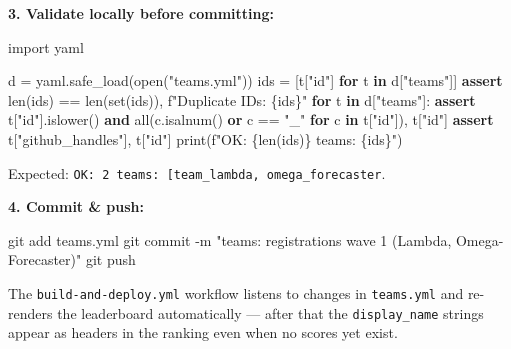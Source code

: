 \documentclass[
  english,
  letterpaper,
]{scrbook}
\newenvironment{Shaded}{\begin{snugshade}}{\end{snugshade}}
\newcommand{\AttributeTok}[1]{\textcolor[rgb]{0.40,0.45,0.13}{#1}}
\newcommand{\BuiltInTok}[1]{\textcolor[rgb]{0.00,0.23,0.31}{#1}}
\newcommand{\ControlFlowTok}[1]{\textcolor[rgb]{0.00,0.23,0.31}{\textbf{#1}}}
\newcommand{\FunctionTok}[1]{\textcolor[rgb]{0.28,0.35,0.67}{#1}}
\newcommand{\ImportTok}[1]{\textcolor[rgb]{0.00,0.46,0.62}{#1}}
\newcommand{\KeywordTok}[1]{\textcolor[rgb]{0.00,0.23,0.31}{\textbf{#1}}}
\newcommand{\NormalTok}[1]{\textcolor[rgb]{0.00,0.23,0.31}{#1}}
\newcommand{\OperatorTok}[1]{\textcolor[rgb]{0.37,0.37,0.37}{#1}}
\newcommand{\SpecialCharTok}[1]{\textcolor[rgb]{0.37,0.37,0.37}{#1}}
\newcommand{\SpecialStringTok}[1]{\textcolor[rgb]{0.13,0.47,0.30}{#1}}
\newcommand{\StringTok}[1]{\textcolor[rgb]{0.13,0.47,0.30}{#1}}
\begin{document}
\textbf{3. Validate locally before committing:}

\protect{}\label{teams-yml-validate}
\begin{Shaded}
\begin{Highlighting}[]
\ImportTok{import}\NormalTok{ yaml}

\NormalTok{d }\OperatorTok{=}\NormalTok{ yaml.safe\_load(}\BuiltInTok{open}\NormalTok{(}\StringTok{"teams.yml"}\NormalTok{))}
\NormalTok{ids }\OperatorTok{=}\NormalTok{ [t[}\StringTok{"id"}\NormalTok{] }\ControlFlowTok{for}\NormalTok{ t }\KeywordTok{in}\NormalTok{ d[}\StringTok{"teams"}\NormalTok{]]}
\ControlFlowTok{assert} \BuiltInTok{len}\NormalTok{(ids) }\OperatorTok{==} \BuiltInTok{len}\NormalTok{(}\BuiltInTok{set}\NormalTok{(ids)), }\SpecialStringTok{f"Duplicate IDs: }\SpecialCharTok{\{}\NormalTok{ids}\SpecialCharTok{\}}\SpecialStringTok{"}
\ControlFlowTok{for}\NormalTok{ t }\KeywordTok{in}\NormalTok{ d[}\StringTok{"teams"}\NormalTok{]:}
    \ControlFlowTok{assert}\NormalTok{ t[}\StringTok{"id"}\NormalTok{].islower() }\KeywordTok{and} \BuiltInTok{all}\NormalTok{(c.isalnum() }\KeywordTok{or}\NormalTok{ c }\OperatorTok{==} \StringTok{"\_"} \ControlFlowTok{for}\NormalTok{ c }\KeywordTok{in}\NormalTok{ t[}\StringTok{"id"}\NormalTok{]), t[}\StringTok{"id"}\NormalTok{]}
    \ControlFlowTok{assert}\NormalTok{ t[}\StringTok{"github\_handles"}\NormalTok{], t[}\StringTok{"id"}\NormalTok{]}
\BuiltInTok{print}\NormalTok{(}\SpecialStringTok{f"OK: }\SpecialCharTok{\{}\BuiltInTok{len}\NormalTok{(ids)}\SpecialCharTok{\}}\SpecialStringTok{ teams: }\SpecialCharTok{\{}\NormalTok{ids}\SpecialCharTok{\}}\SpecialStringTok{"}\NormalTok{)}
\end{Highlighting}
\end{Shaded}

Expected:
\texttt{OK:\ 2\ teams:\ {[}\textquotesingle{}team\_lambda\textquotesingle{},\ \textquotesingle{}omega\_forecaster\textquotesingle{}{]}}.

\textbf{4. Commit \& push:}

\begin{Shaded}
\begin{Highlighting}[]
\FunctionTok{git}\NormalTok{ add teams.yml}
\FunctionTok{git}\NormalTok{ commit }\AttributeTok{{-}m} \StringTok{"teams: registrations wave 1 (Lambda, Omega{-}Forecaster)"}
\FunctionTok{git}\NormalTok{ push}
\end{Highlighting}
\end{Shaded}

The \texttt{build-and-deploy.yml} workflow listens to changes in
\texttt{teams.yml} and re-renders the leaderboard automatically ---
after that the \texttt{display\_name} strings appear as headers in the
ranking even when no scores yet exist.
\end{document}
